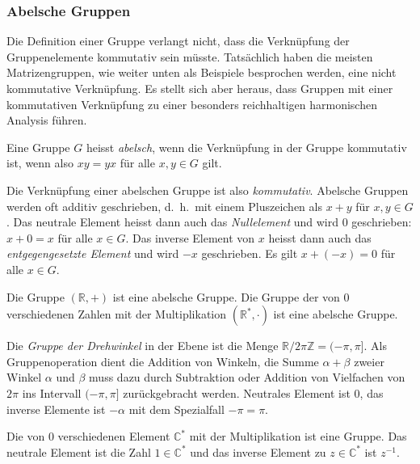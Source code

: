 %
%
\subsubsection{Abelsche Gruppen}
Die Definition einer Gruppe verlangt nicht, dass die Verknüpfung der
Gruppenelemente kommutativ sein müsste.
Tatsächlich haben die meisten Matrizengruppen, wie weiter unten als 
Beispiele besprochen werden, eine nicht kommutative Verknüpfung.
Es stellt sich aber heraus, dass Gruppen mit einer kommutativen
Verknüpfung zu einer besonders reichhaltigen harmonischen Analysis
führen.

\begin{definition}
\label{buch:gruppen:definition:abelsch}
Eine Gruppe $G$ heisst {\em abelsch}, wenn 
die Verknüpfung in der Gruppe kommutativ ist, wenn also
$xy=yx$ für alle $x,y\in G$ gilt.
\end{definition}

Die Verknüpfung einer abelschen Gruppe ist also {\em kommutativ}.
%
Abelsche Gruppen werden oft additiv geschrieben, d.~h.~mit einem
Pluszeichen als $x+y$ für $x,y\in G$.
Das neutrale Element heisst dann auch das {\em Nullelement} und wird $0$
geschrieben: $x+0=x$ für alle $x\in G$.
Das inverse Element von $x$ heisst dann auch das
{\em entgegengesetzte Element} und wird $-x$ geschrieben. 
Es gilt $x+(-x)=0$ für alle $x\in G$.

\begin{beispiel}
Die Gruppe $(\mathbb{R},+)$ ist eine abelsche Gruppe.
Die Gruppe der von $0$ verschiedenen Zahlen mit der Multiplikation
$(\mathbb{R}^*,\cdot)$ ist eine abelsche Gruppe.
\end{beispiel}

\begin{beispiel}
Die {\em Gruppe der Drehwinkel} in der Ebene ist die Menge
\(
\mathbb{R}/2\pi\mathbb{Z}
=
(-\pi,\pi].
\)
Als Gruppenoperation dient die Addition von Winkeln, die Summe
$\alpha+\beta$ zweier Winkel $\alpha$ und $\beta$ muss dazu durch
Subtraktion oder Addition von Vielfachen von $2\pi$ ins Intervall
$(-\pi,\pi]$ zurückgebracht werden.
Neutrales Element ist $0$, das inverse Elemente ist $-\alpha$ mit
dem Spezialfall $-\pi=\pi$.
\end{beispiel}

\begin{beispiel}
Die von $0$ verschiedenen Element $\mathbb{C}^*$ mit der Multiplikation
ist eine Gruppe.
Das neutrale Element ist die Zahl $1\in\mathbb{C}^*$ und das inverse
Element zu $z\in\mathbb{C}^*$ ist $z^{-1}$.
\end{beispiel}

